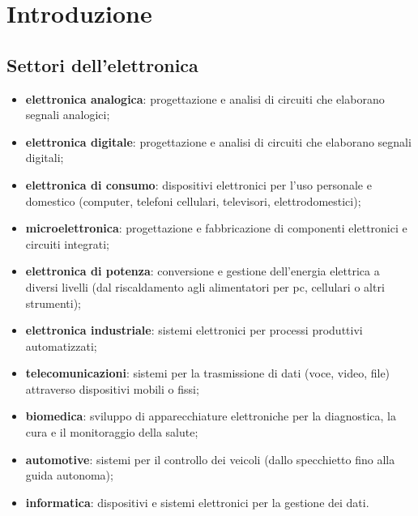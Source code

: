 \section{Introduzione}
\subsection{Settori dell'elettronica}
\begin{itemize}
	\item \textbf{elettronica analogica}: progettazione e analisi di circuiti che elaborano segnali analogici;
	\item \textbf{elettronica digitale}: progettazione e analisi di circuiti che elaborano segnali digitali;
	\item \textbf{elettronica di consumo}: dispositivi elettronici per l'uso personale e domestico (computer, telefoni cellulari, televisori, elettrodomestici);
	\item \textbf{microelettronica}: progettazione e fabbricazione di componenti elettronici e circuiti integrati;
	\item \textbf{elettronica di potenza}: conversione e gestione dell'energia elettrica a diversi livelli (dal riscaldamento agli alimentatori per pc, cellulari o altri strumenti);
	\item \textbf{elettronica industriale}: sistemi elettronici per processi produttivi automatizzati;
	\item \textbf{telecomunicazioni}: sistemi per la trasmissione di dati (voce, video, file) attraverso dispositivi mobili o fissi;
	\item \textbf{biomedica}: sviluppo di apparecchiature elettroniche per la diagnostica, la cura e il monitoraggio della salute;
	\item \textbf{automotive}: sistemi per il controllo dei veicoli (dallo specchietto fino alla guida autonoma);
	\item \textbf{informatica}: dispositivi e sistemi elettronici per la gestione dei dati.
\end{itemize}

